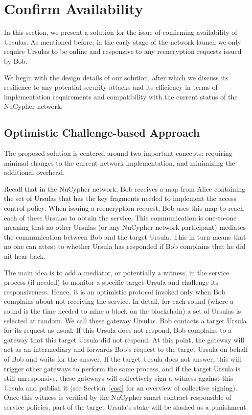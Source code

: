 \section{Confirm Availability}
In this section, we present a solution for the issue of confirming availability of 
Ursulas. As mentioned before, in the early stage of the network launch we only 
require Ursulas to be online and responsive to any reencryption 
requests issued by Bob. 


We begin with the design details of our solution, after which we discuss its 
resilience to any potential security attacks and its efficiency in terms of implementation 
requirements and compatibility with the current status of the NuCypher network.


\subsection{Optimistic Challenge-based Approach}
The proposed solution is centered around two important concepts: requiring minimal 
changes to the current network implementation, and minimizing the additional overhead. 


Recall that in the NuCypher network, Bob receives a map from Alice containing 
the set of Ursulas that has the key fragments needed to implement the access control policy. 
When issuing a reencryption request, Bob uses this map to reach each of these Ursulas to obtain 
the service. This communication is one-to-one meaning that no other Ursulas (or any 
NuCypher network participant) mediates the communication between Bob and the target  
Ursula. This in turn means that no one can attest to whether Ursula has responded if Bob 
complains that he did nit hear back.


The main idea is to add a mediator, or potentially a witness, in the service process (if needed) to monitor 
a specific target Ursula and challenge its responsiveness. Hence, it is an optimistic protocol invoked 
only when Bob complains about not receiving the service. In detail, for each round (where a 
round is the time needed to mine a block on the blockchain) a set of Ursulas is selected at 
random. We call these gateway Ursulas. Bob contacts a target Ursula for its request as usual. 
If this Ursula does not respond, Bob complains to a gateway that this target Ursula 
did not respond. At this point, the gateway will act as an intermediary and forwards 
Bob's request to the target Ursula on behalf of Bob and waits for the answer. If the target 
Ursula does not answer, this will trigger other gateways to perform the same process, and if the target 
Ursula is still unresponsive, these gateways will collectively sign a witness against 
this Ursula and publish it (see Section~\ref{cosi} for an overview of collective signing). 
Once this witness is verified by the NuCypher smart contract responsible of service policies, 
part of the target Ursula's stake will be slashed as a punishment.


